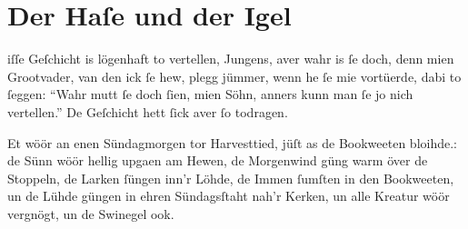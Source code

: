 \section*{Der Haſe und der Igel}
iſſe Geſchicht is lögenhaft to vertellen, Jungens, aver wahr
is ſe doch, denn mien Grootvader, van den ick ſe hew, plegg jümmer,
wenn he ſe mie vortüerde,
dabi to ſeggen:
\enquote{Wahr mutt ſe doch ſien, mien Söhn, anners kunn man ſe jo
nich vertellen.} De Geſchicht hett ſick aver ſo todragen.

Et wöör an enen Sündagmorgen tor Harvesttied, jüſt as de Bookweeten
bloihde.: de Sünn wöör hellig upgaen am Hewen, de Morgenwind güng
warm över de Stoppeln, de Larken ſüngen inn'r Löhde,
de Immen ſumſten in den Bookweeten, un de Lühde güngen in ehren
Sündagsſtaht nah'r Kerken, un alle Kreatur wöör vergnögt, un de
Swinegel ook.

